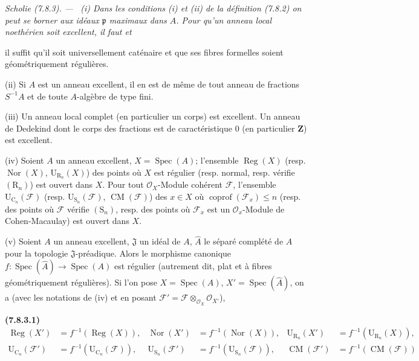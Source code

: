 \documentclass[10pt,oneside]{book}
\makeatletter
\newcommand{\oldpage}[2][]{%
  \setcounter{footnote}{0}%
  \marginpar{\scriptsize\textbf{#1}~|~#2}\ignorespaces}
\newenvironment{env}[1][]{\par\medskip\noindent\textbf{(#1)}\ }{\par}
\newenvironment{scholium}[1][]{%
  \par\medskip\noindent\itshape Scholie (#1). ---\ }{\par}
\newcommand{\EGAReaderTarget}[2]{\hypertarget{#1}{}\@bsphack\begingroup\def\@currentHref{#1}\label{#2}\endgroup\@esphack}
\makeatother
\begin{document}
\begin{scholium}[7.8.3]
\EGAReaderTarget{ega4.c04.statement.7-8-3}{IV.2.s7.8.3-fr}
(i) Dans les conditions (i) et (ii) de la définition (7.8.2) on peut se borner
aux idéaux $\mathfrak p$ maximaux dans $A$. Pour qu'un anneau local noethérien
soit excellent, il faut et

\oldpage[IV-2]{215}

il suffit qu'il soit universellement caténaire et que ses fibres formelles
soient géométriquement régulières.

(ii) Si $A$ est un anneau excellent, il en est de même de tout anneau de
fractions $S^{-1}A$ et de toute $A$-algèbre de type fini.

(iii) Un anneau local complet (en particulier un corps) est excellent. Un
anneau de Dedekind dont le corps des fractions est de caractéristique $0$ (en
particulier $\mathbf Z$) est excellent.

(iv) Soient $A$ un anneau excellent, $X=\operatorname{Spec}(A)$; l'ensemble
$\operatorname{Reg}(X)$ (resp. $\operatorname{Nor}(X)$,
$\mathrm U_{\mathrm R_n}(X)$) des points où $X$ est régulier (resp. normal,
resp. vérifie $(\mathrm R_n)$) est ouvert dans $X$. Pour tout
$\mathcal O_X$-Module cohérent $\mathcal F$, l'ensemble
$\mathrm U_{\mathrm C_n}(\mathcal F)$ (resp.
$\mathrm U_{\mathrm S_n}(\mathcal F)$, $\operatorname{CM}(\mathcal F)$) des
$x\in X$ où $\operatorname{coprof}(\mathcal F_x)\leq n$ (resp. des points où
$\mathcal F$ vérifie $(\mathrm S_n)$, resp. des points où $\mathcal F_x$ est un
$\mathcal O_x$-Module de Cohen-Macaulay) est ouvert dans $X$.

(v) Soient $A$ un anneau excellent, $\mathfrak J$ un idéal de $A$,
$\widehat A$ le séparé complété de $A$ pour la topologie $\mathfrak J$-préadique.
Alors le morphisme canonique
$f:\operatorname{Spec}(\widehat A)\to\operatorname{Spec}(A)$ est régulier
(autrement dit, plat et à fibres géométriquement régulières). Si l'on pose
$X=\operatorname{Spec}(A)$, $X'=\operatorname{Spec}(\widehat A)$, on a (avec
les notations de (iv) et en posant
$\mathcal F'=\mathcal F\otimes_{\mathcal O_X}\mathcal O_{X'}$),
\begin{env}[7.8.3.1]
\label{IV.2.s7.8.3.1-fr}
\begin{align*}
\operatorname{Reg}(X')&=f^{-1}(\operatorname{Reg}(X)),&
\operatorname{Nor}(X')&=f^{-1}(\operatorname{Nor}(X)),&
\mathrm U_{\mathrm R_n}(X')&=f^{-1}(\mathrm U_{\mathrm R_n}(X)),\\
\mathrm U_{\mathrm C_n}(\mathcal F')&=f^{-1}(\mathrm U_{\mathrm C_n}(\mathcal F)),&
\mathrm U_{\mathrm S_n}(\mathcal F')&=f^{-1}(\mathrm U_{\mathrm S_n}(\mathcal F)),&
\operatorname{CM}(\mathcal F')&=f^{-1}(\operatorname{CM}(\mathcal F))
\end{align*}
\end{env}


\end{scholium}
\end{document}
